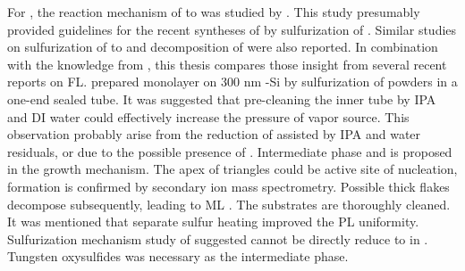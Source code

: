 For , the reaction mechanism of  to  was studied by \citeauthor{Weber1996}.\cite{Weber1996} This study presumably provided guidelines for the recent syntheses of  by sulfurization of .\cite{Lin2012,Lee2012b,Liu2012a,Najmaei2013} Similar studies on sulfurization of  to  and decomposition of  were also reported.\cite{VanderVlies2002,VanderVlies2002a} In combination with the knowledge from , this thesis compares those insight from several recent reports on  FL. \citeauthor{Cong2013} prepared monolayer  on 300 nm -Si by sulfurization of  powders in a one-end sealed tube.\cite{Cong2013} It was suggested that pre-cleaning the inner tube by IPA and DI water could effectively increase the pressure of vapor source. This observation probably arise from the reduction of  assisted by IPA and water residuals, or due to the possible presence of . Intermediate phase  and  is proposed in the growth mechanism. The apex of triangles could be active site of nucleation,  formation is confirmed by secondary ion mass spectrometry. Possible thick  flakes decompose subsequently, leading to ML . The substrates are thoroughly cleaned. It was mentioned that separate sulfur heating improved the PL uniformity. Sulfurization mechanism study of  suggested  cannot be directly reduce to  in .\cite{VanderVlies2002,VanderVlies2002a} Tungsten oxysulfides was necessary as the intermediate phase. 

